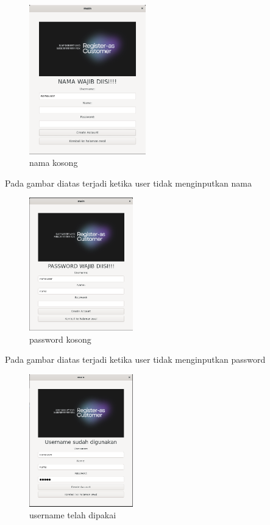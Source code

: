 \documentclass[a4paper,12pt]{article}
\begin{document}
\begin{figure}[!htbp]
    \centering
    \includegraphics[width=0.45\textwidth]{./img/nama_kosong.png}
    \caption{nama kosong}
\end{figure}
\FloatBarrier
Pada gambar diatas terjadi ketika user tidak menginputkan nama 
\begin{figure}[htbp]
    \centering
    \includegraphics[width=0.4\textwidth]{./img/password_kosong.png}
    \caption{password kosong}
\end{figure}
\FloatBarrier
Pada gambar diatas terjadi ketika user tidak menginputkan password
\begin{figure}[!htbp]
    \centering
    \includegraphics[width=0.4\textwidth]{./img/username_dipakai.png}
    \caption{username telah dipakai}
\end{figure}
\end{document}
